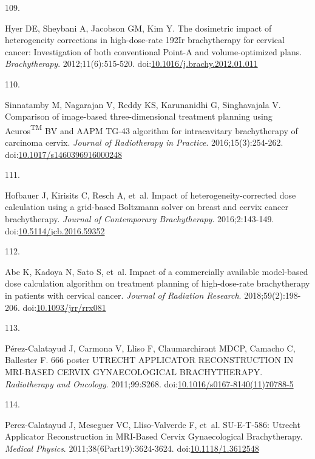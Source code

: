 \documentclass[
  a4paper,
]{scrreprt}
\newlength{\cslhangindent}
\newlength{\csllabelwidth}
\newlength{\cslentryspacingunit} %
\newenvironment{CSLReferences}[2] %
 {%
  \setlength{\parindent}{0pt}
  \ifodd #1
  \let\oldpar\par
  \def\par{\hangindent=\cslhangindent\oldpar}
  \fi
  \setlength{\parskip}{#2\cslentryspacingunit}
 }%
 {}
\newcommand{\CSLLeftMargin}[1]{\parbox[t]{\csllabelwidth}{#1}}
\newcommand{\CSLRightInline}[1]{\parbox[t]{\linewidth - \csllabelwidth}{#1}\break}
\begin{document}
\begin{CSLReferences}{0}{0}
\leavevmode{}%
\CSLLeftMargin{109. }%
\CSLRightInline{Hyer DE, Sheybani A, Jacobson GM, Kim Y. The dosimetric
impact of heterogeneity corrections in high-dose-rate 192Ir
brachytherapy for cervical cancer: Investigation of both conventional
Point-A and volume-optimized plans. \emph{Brachytherapy}.
2012;11(6):515-520.
doi:\href{https://doi.org/10.1016/j.brachy.2012.01.011}{10.1016/j.brachy.2012.01.011}}

\leavevmode{}%
\CSLLeftMargin{110. }%
\CSLRightInline{Sinnatamby M, Nagarajan V, Reddy KS, Karunanidhi G,
Singhavajala V. Comparison of image-based three-dimensional treatment
planning using Acuros{\textsuperscript{TM}} BV and AAPM TG-43 algorithm
for intracavitary brachytherapy of carcinoma cervix. \emph{Journal of
Radiotherapy in Practice}. 2016;15(3):254-262.
doi:\href{https://doi.org/10.1017/s1460396916000248}{10.1017/s1460396916000248}}

\leavevmode{}%
\CSLLeftMargin{111. }%
\CSLRightInline{Hofbauer J, Kirisits C, Resch A, et~al. Impact of
heterogeneity-corrected dose calculation using a grid-based Boltzmann
solver on breast and cervix cancer brachytherapy. \emph{Journal of
Contemporary Brachytherapy}. 2016;2:143-149.
doi:\href{https://doi.org/10.5114/jcb.2016.59352}{10.5114/jcb.2016.59352}}

\leavevmode{}%
\CSLLeftMargin{112. }%
\CSLRightInline{Abe K, Kadoya N, Sato S, et~al. Impact of a commercially
available model-based dose calculation algorithm on treatment planning
of high-dose-rate brachytherapy in patients with cervical cancer.
\emph{Journal of Radiation Research}. 2018;59(2):198-206.
doi:\href{https://doi.org/10.1093/jrr/rrx081}{10.1093/jrr/rrx081}}

\leavevmode{}%
\CSLLeftMargin{113. }%
\CSLRightInline{Pérez-Calatayud J, Carmona V, Lliso F, Claumarchirant
MDCP, Camacho C, Ballester F. 666 poster UTRECHT APPLICATOR
RECONSTRUCTION IN MRI-BASED CERVIX GYNAECOLOGICAL BRACHYTHERAPY.
\emph{Radiotherapy and Oncology}. 2011;99:S268.
doi:\href{https://doi.org/10.1016/s0167-8140(11)70788-5}{10.1016/s0167-8140(11)70788-5}}

\leavevmode{}%
\CSLLeftMargin{114. }%
\CSLRightInline{Perez-Calatayud J, Meseguer VC, Lliso-Valverde F, et~al.
SU-E-T-586: Utrecht Applicator Reconstruction in MRI-Based Cervix
Gynaecological Brachytherapy. \emph{Medical Physics}.
2011;38(6Part19):3624-3624.
doi:\href{https://doi.org/10.1118/1.3612548}{10.1118/1.3612548}}


\end{CSLReferences}
\end{document}
